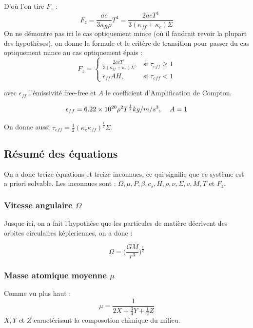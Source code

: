 \documentclass[a4paper,12pt]{article}
\begin{document}
D'où l'on tire $F_z$ :
\begin{equation*}
    F_z=\frac{ac}{3\kappa_R \rho}T^4=\frac{2acT^4}{3(\kappa_{ff}+\kappa_e)\Sigma}
\end{equation*}
On ne démontre pas ici le cas optiquement mince (où il faudrait revoir la plupart des hypothèses), on donne la formule et le critère de transition pour passer du cas optiquement mince au cas optiquement épais :
\begin{equation}
    F_z=\begin{cases} \frac{2acT^4}{3(\kappa_{ff}+\kappa_e)\Sigma}, & \mbox{si } \tau_{eff} \geq 1\\ \epsilon_{ff}AH, & \mbox{si } \tau_{eff} < 1  \end{cases}
\end{equation}

avec $\epsilon_{ff}$ l'émissivité free-free et $A$ le coefficient d'Amplification de Compton.

$$\epsilon_{ff} = 6.22 \times 10^{20} \rho^{2} T^{\frac{1}{2}} \text{$kg/m/s^3$, \quad} A=1 $$

On donne aussi $\tau_{eff}=\frac{1}{2}(\kappa_e \kappa_{ff})^{\frac{1}{2}}\Sigma$.


\subsection{Résumé des équations}

On a donc treize équations et treize inconnues, ce qui signifie que ce système est a priori solvable.
Les inconnues sont : $\Omega, \mu, P, \beta, c_s, H, \rho, \nu, \Sigma, v, \dot M, T$ et $F_z$.

\subsubsection{Vitesse angulaire $\Omega$}
Jusque ici, on a fait l'hypothèse que les particules de matière décrivent des orbites circulaires képleriennes, on a donc :

\begin{equation}
    \Omega = \Big( \frac{GM}{r^3}\Big) ^{\frac{1}{2}}
\end{equation}


\subsubsection{Masse atomique moyenne $\mu$}
Comme vu plus haut : 
\begin{equation}
    \mu = \frac{1}{2X+\frac{3}{4}Y+\frac{1}{2}Z}
\end{equation}
$X,Y$ et $Z$ caractérisant la composotion chimique du milieu.
\end{document}

